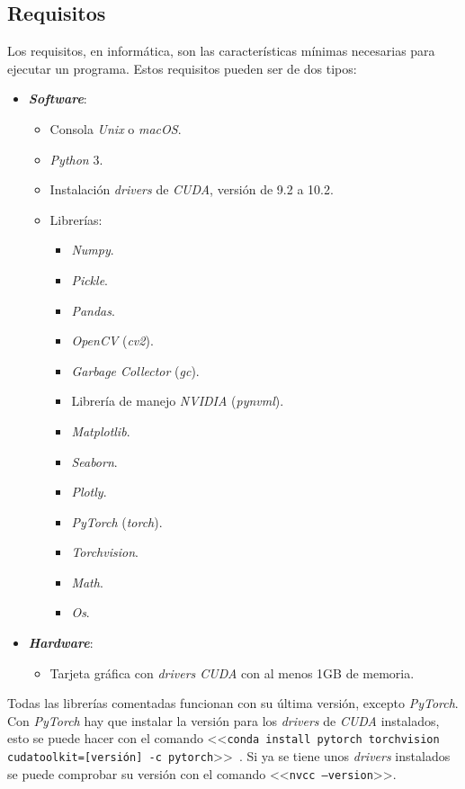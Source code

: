 \subsection{Requisitos}
Los requisitos, en informática, son las características mínimas necesarias para ejecutar un programa. Estos requisitos pueden ser de dos tipos:
\begin{itemize}
	\item \textbf{\textit{Software}}:
	\begin{itemize}
		\item Consola \textit{Unix} o \textit{macOS}.
		\item \textit{Python} 3.
		\item Instalación \textit{drivers} de \textit{CUDA}, versión de 9.2 a 10.2.
		\item Librerías:
		\begin{itemize}
			\item \textit{Numpy}.
			\item \textit{Pickle}.
			\item \textit{Pandas}.
			\item \textit{OpenCV} (\textit{cv2}).
			\item \textit{Garbage Collector} (\textit{gc}).
			\item Librería de manejo \textit{NVIDIA} (\textit{pynvml}).
			\item \textit{Matplotlib}.
			\item \textit{Seaborn}.
			\item \textit{Plotly}.
			\item \textit{PyTorch} (\textit{torch}).
			\item \textit{Torchvision}.
			\item \textit{Math}.
			\item \textit{Os}.
		\end{itemize}
	\end{itemize}
	\item \textbf{\textit{Hardware}}:
	\begin{itemize}
		\item Tarjeta gráfica con \textit{drivers CUDA} con al menos 1GB de memoria.
	\end{itemize}
\end{itemize}

Todas las librerías comentadas funcionan con su última versión, excepto \textit{PyTorch}. Con \textit{PyTorch} hay que instalar la versión para los \textit{drivers} de \textit{CUDA} instalados, esto se puede hacer con el comando <<\texttt{conda install pytorch torchvision cudatoolkit=[versión] -c pytorch}>>~\cite{paszke2017automatic}. Si ya se tiene unos \textit{drivers} instalados se puede comprobar su versión con el comando <<\texttt{nvcc --version}>>.

